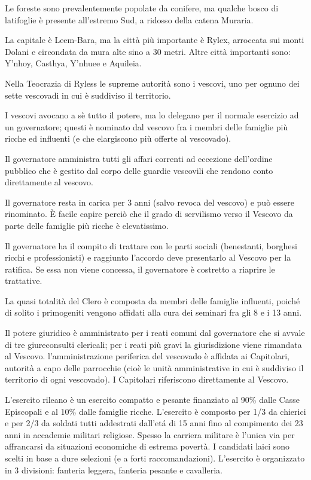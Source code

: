 Le foreste sono prevalentemente popolate da conifere, ma qualche bosco
di latifoglie \`e presente all'estremo Sud, a ridosso della catena
Muraria. 

La capitale \`e Leem-Bara, ma la citt\`a pi\`u importante \`e Rylex,
arroccata sui monti Dolani e circondata da mura alte sino a 30 metri.
Altre citt\`a importanti sono: Y'nhoy, Casthya, Y'nhuee e Aquileia.

\Politica Nella Teocrazia di Ryless le supreme autorit\`a sono i
vescovi, uno per ognuno dei sette vescovadi in cui \`e suddiviso il
territorio. 

I vescovi avocano a s\`e tutto il potere, ma lo delegano
per il normale esercizio ad un governatore; questi \`e nominato dal
vescovo fra i membri delle famiglie pi\`u ricche ed influenti (e che
elargiscono pi\`u offerte al vescovado).  

Il governatore amministra tutti gli affari correnti ad eccezione
dell'ordine pubblico che \`e gestito dal corpo delle guardie vescovili
che rendono conto direttamente al vescovo.

Il governatore resta in carica per 3 anni (salvo revoca del vescovo) e
pu\`o essere rinominato. \`E facile capire perci\`o che il grado di
servilismo verso il Vescovo da parte delle famiglie pi\`u ricche \`e
elevatissimo.

Il governatore ha il compito di trattare con le parti sociali
(benestanti, borghesi ricchi e professionisti) e raggiunto l'accordo
deve presentarlo al Vescovo per la ratifica. Se essa non viene
concessa, il governatore \`e costretto a riaprire le trattative. 

La quasi totalit\`a del Clero \`e composta da membri delle famiglie
influenti, poich\'e di solito i primogeniti vengono affidati alla cura
dei seminari fra gli 8 e i 13 anni.

Il potere giuridico \`e amministrato per i reati comuni dal
governatore che si avvale di tre giureconsulti clericali; per i reati
pi\`u gravi la giurisdizione viene rimandata al Vescovo.
l'amministrazione periferica del vescovado \`e affidata ai Capitolari,
autorit\`a a capo delle parrocchie (cio\`e le unit\`a amministrative
in cui \`e suddiviso il territorio di ogni vescovado).  I Capitolari
riferiscono direttamente al Vescovo.

\Esercito L'esercito rileano \`e un esercito compatto e pesante
finanziato al 90\% dalle Casse Episcopali e al 10\% dalle famiglie
ricche. L'esercito \`e composto per 1/3 da chierici e per 2/3 da
soldati tutti addestrati dall'et\'a di 15 anni fino al compimento dei 
23 anni in accademie militari
religiose.  Spesso la carriera militare \`e l'unica via per
affrancarsi da situazioni economiche di estrema povert\`a. I candidati
laici sono scelti in base a dure selezioni (e a forti
raccomandazioni). L'esercito \`e organizzato in 3 divisioni: fanteria
leggera, fanteria pesante e cavalleria.

